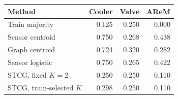 \begin{tabular}{lrrr}
\toprule
Method & Cooler & Valve & AReM \\
\midrule
Train majority & 0.125 & 0.250 & 0.000 \\
Sensor centroid & 0.750 & 0.268 & 0.438 \\
Graph centroid & 0.724 & 0.320 & 0.282 \\
Sensor logistic & 0.750 & 0.265 & 0.422 \\
STCG, fixed $K{=}2$ & 0.250 & 0.250 & 0.110 \\
STCG, train-selected $K$ & 0.298 & 0.250 & 0.110 \\
\bottomrule
\end{tabular}
